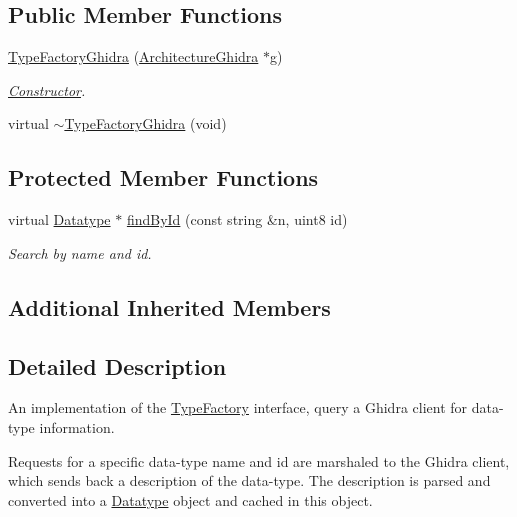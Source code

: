 \subsection*{Public Member Functions}
\begin{DoxyCompactItemize}
\item 
\mbox{\hyperlink{class_type_factory_ghidra_a999a899582a918951fcf6607b8798fd3}{Type\+Factory\+Ghidra}} (\mbox{\hyperlink{class_architecture_ghidra}{Architecture\+Ghidra}} $\ast$g)
\begin{DoxyCompactList}\small\item\em \mbox{\hyperlink{class_constructor}{Constructor}}. \end{DoxyCompactList}\item 
virtual \mbox{\hyperlink{class_type_factory_ghidra_a20bf48acd3a1f656c176312359fd3e8b}{$\sim$\+Type\+Factory\+Ghidra}} (void)
\end{DoxyCompactItemize}
\subsection*{Protected Member Functions}
\begin{DoxyCompactItemize}
\item 
virtual \mbox{\hyperlink{class_datatype}{Datatype}} $\ast$ \mbox{\hyperlink{class_type_factory_ghidra_a494fd9c2fb18db1b1f9ee4d7078d590c}{find\+By\+Id}} (const string \&n, uint8 id)
\begin{DoxyCompactList}\small\item\em Search by name and id. \end{DoxyCompactList}\end{DoxyCompactItemize}
\subsection*{Additional Inherited Members}


\subsection{Detailed Description}
An implementation of the \mbox{\hyperlink{class_type_factory}{Type\+Factory}} interface, query a Ghidra client for data-\/type information. 

Requests for a specific data-\/type name and id are marshaled to the Ghidra client, which sends back a description of the data-\/type. The description is parsed and converted into a \mbox{\hyperlink{class_datatype}{Datatype}} object and cached in this object. 

